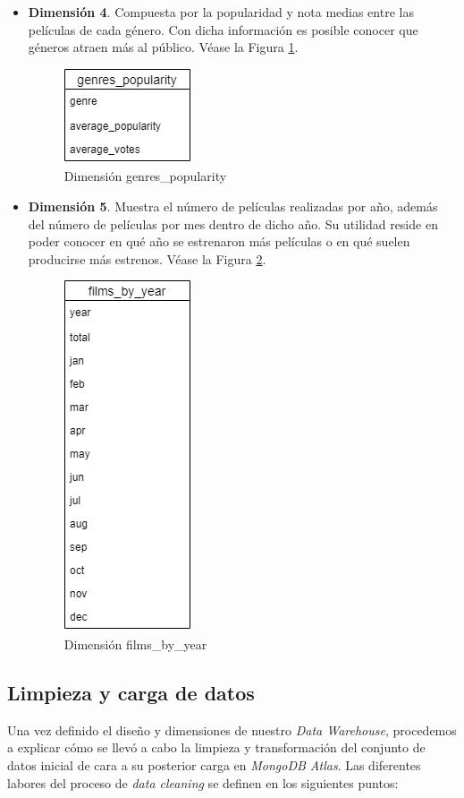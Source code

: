 \documentclass[11pt,a4paper]{article}
\begin{document}
\begin{itemize}
	\item \textbf{Dimensión 4}. Compuesta por la popularidad y nota medias entre las películas de cada género. Con dicha información es posible conocer que géneros atraen más al público. Véase la Figura \ref{fig:dim4}.
	
	\begin{figure}[h]
		\centering
		\includegraphics[width=0.2\linewidth]{./images/Dimension4.png} 
		\caption{Dimensión genres\_popularity}
		\label{fig:dim4}
	\end{figure}
	
	\item \textbf{Dimensión 5}. Muestra el número de películas realizadas por año, además del número de películas por mes dentro de dicho año. Su utilidad reside en poder conocer en qué año se estrenaron más películas o en qué suelen producirse más estrenos. Véase la Figura \ref{fig:dim5}.
	
	\begin{figure}[h]
		\centering
		\includegraphics[width=0.2\linewidth]{./images/Dimension5.png} 
		\caption{Dimensión films\_by\_year}
		\label{fig:dim5}
	\end{figure}
	
\end{itemize}

\subsection{Limpieza y carga de datos}

Una vez definido el diseño y dimensiones de nuestro \textit{Data Warehouse}, procedemos a explicar cómo se llevó a cabo la limpieza y transformación del conjunto de datos inicial de cara a su posterior carga en \textit{MongoDB Atlas}. Las diferentes labores del proceso de \textit{data cleaning} se definen en los siguientes puntos:
\end{document}
